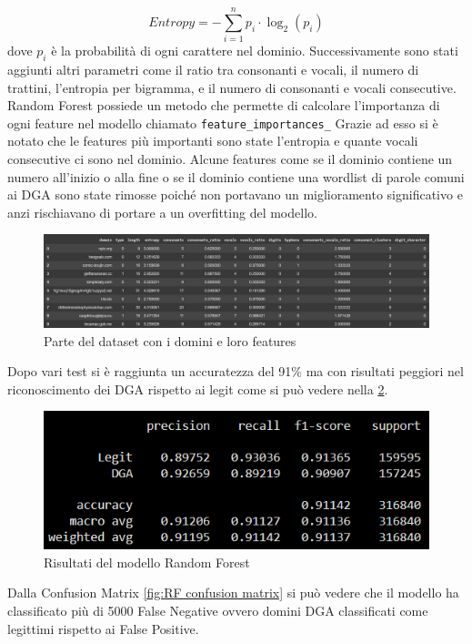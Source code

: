 \documentclass[12pt,a4paper,openright,twoside]{book}
\begin{document}
\begin{equation}
    Entropy = -\sum_{i=1}^{n} p_i \cdot \log_2(p_i)
\end{equation}
dove $p_i$ è la probabilità di ogni carattere nel dominio. \hfil \break
Successivamente sono stati aggiunti altri parametri come il ratio tra consonanti e vocali,
il numero di trattini, l'entropia per bigramma, e il numero di consonanti e vocali consecutive.
Random Forest possiede un metodo che permette di calcolare l'importanza di ogni feature nel modello
chiamato \texttt{feature\_importances\_}
Grazie ad esso si è notato che le features più importanti sono state
l'entropia e quante vocali consecutive ci sono nel dominio.
Alcune features come se il dominio contiene un numero all'inizio o alla fine
o se il dominio contiene una wordlist di parole comuni ai DGA sono state
rimosse poiché non portavano un miglioramento significativo e anzi 
rischiavano di portare a un overfitting del modello.
\begin{figure}[H]
    \centering
    \includegraphics[width=.8\linewidth]{figures/RF_feature.png}
    \caption{Parte del dataset con i domini e loro features}
    \label{fig:RF feature}
\end{figure}
\noindent Dopo vari test si è raggiunta un accuratezza del 91\% ma
con risultati peggiori nel riconoscimento dei DGA rispetto ai legit come si può vedere nella \cref{fig:RF results}.

\begin{figure}[H]
    \centering
    \includegraphics[width=.8\linewidth]{figures/RF_results.png}
    \caption{Risultati del modello Random Forest}
    \label{fig:RF results}
\end{figure}

\noindent Dalla Confusion Matrix \ref{fig:RF confusion matrix} si può vedere che il modello ha classificato
più di 5000 False Negative ovvero domini DGA classificati come legittimi rispetto ai False Positive.
\end{document}
